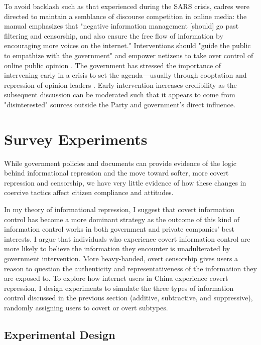 \documentclass[11pt]{article}
\begin{document}
To avoid backlash such as that experienced during the SARS crisis, cadres were directed to maintain a semblance of discourse competition in online media: the manual emphasizes that "negative information management [should] go past filtering and censorship, and also ensure the free flow of information by encouraging more voices on the internet." Interventions should "guide the public to empathize with the government" and empower netizens to take over control of online public opinion \citep[12-15]{zou2015wangluo}. The government has stressed the importance of intervening early in a crisis to set the agenda---usually through cooptation and repression of opinion leaders \citep[180-194][]{zeng2015wangluo,zhou2011weibo}. Early intervention increases credibility as the subsequent discussion can be moderated such that it appears to come from "disinterested" sources outside the Party and government's direct influence.

\section{Survey Experiments}

While government policies and documents can provide evidence of the logic behind informational repression and the move toward softer, more covert repression and censorship, we have very little evidence of how these changes in coercive tactics affect citizen compliance and attitudes.

In my theory of informational repression, I suggest that covert information control has become a more dominant strategy as the outcome of this kind of information control works in both government and private companies' best interests. I argue that individuals who experience covert information control are more likely to believe the information they encounter is unadulterated by government intervention. More heavy-handed, overt censorship gives users a reason to question the authenticity and representativeness of the information they are exposed to. To explore how internet users in China experience covert repression, I design experiments to simulate the three types of information control discussed in the previous section (additive, subtractive, and suppressive), randomly assigning users to covert or overt subtypes.

\subsection{Experimental Design}
\end{document}
